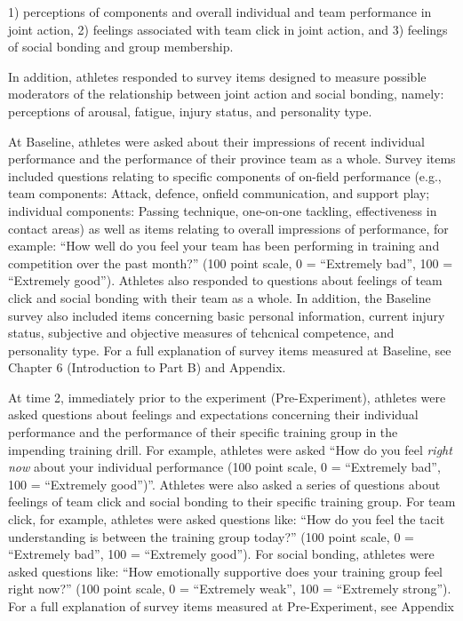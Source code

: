 1) perceptions of components and overall individual and team performance in joint action,
2) feelings associated with team click in joint action, and
3) feelings of social bonding and group membership.

In addition, athletes responded to survey items designed to measure possible moderators of the relationship between joint action and social bonding, namely: perceptions of arousal, fatigue, injury status, and personality type.


At Baseline, athletes were asked about their impressions of recent individual performance and the performance of their province team as a whole.  Survey items included questions relating to specific components of on-field performance (e.g., team components: Attack, defence, onfield communication, and support play; individual components: Passing technique, one-on-one tackling, effectiveness in contact areas) as well as items relating to overall impressions of performance, for example: ``How well do you feel your team has been performing in training and competition over the past month?'' (100 point scale, 0 = ``Extremely bad'', 100 = ``Extremely good'').  Athletes also responded to questions about feelings of team click and social bonding with their team as a whole. In addition, the Baseline survey also included items concerning basic personal information, current injury status, subjective and objective measures of tehcnical competence, and personality type.
For a full explanation of survey items measured at Baseline, see Chapter 6 (Introduction to Part B) and Appendix.

At time 2, immediately prior to the experiment (Pre-Experiment), athletes were asked questions about feelings and expectations concerning their individual performance and the performance of their specific training group in the impending training drill.
For example,  athletes were asked ``How do you feel \textit{right now} about your individual performance (100 point scale, 0 = ``Extremely bad'', 100 = ``Extremely good'')''.  Athletes were also asked a series of questions about feelings of team click and social bonding to their specific training group. For team click, for example, athletes were asked questions like: ``How do you feel the tacit understanding is between the training group today?'' (100 point scale, 0 = ``Extremely bad'', 100 = ``Extremely good'').  For social bonding, athletes were asked questions like: ``How emotionally supportive does your training group feel right now?'' (100 point scale, 0 = ``Extremely weak'', 100 = ``Extremely strong'').
For a full explanation of survey items measured at Pre-Experiment, see Appendix

